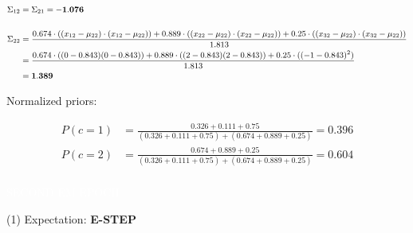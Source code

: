 \documentclass[12pt]{article}
\begin{document}
\begin{enumerate}
    \begin{equation*}
        \fontsize{9pt}{10pt}\selectfont
        \begin{aligned}
            \Sigma_{12} &= \Sigma_{21} = \mathbf{-1.076}\\
            \\
            \Sigma_{22} &= \frac{0.674 \cdot ((x_{12}-\mu_{22}) \cdot (x_{12} - \mu_{22}))+ 0.889 \cdot ((x_{22}-\mu_{22}) \cdot (x_{22} - \mu_{22}))+ 0.25 \cdot ((x_{32}-\mu_{22}) \cdot (x_{32} - \mu_{22}))}{1.813}\\
            &=\frac{0.674 \cdot ((0-0.843)(0-0.843)) + 0.889 \cdot ((2-0.843)(2-0.843)) + 0.25 \cdot ((-1-0.843)^2)}{1.813}\\
            &= \mathbf{1.389}\\
        \end{aligned}
    \end{equation*}

    Normalized priors:

    \begin{equation*}
        \begin{aligned}
            P(c=1) &= \frac{0.326+0.111+0.75}{(0.326+0.111+0.75) + (0.674+0.889+0.25)} = 0.396\\
            P(c=2) &= \frac{0.674+0.889+0.25}{(0.326+0.111+0.75) + (0.674+0.889+0.25)} = 0.604\\
        \end{aligned}
    \end{equation*}

    \vspace{20pt}
    \colorbox{codeblue}{\textcolor{white}{SECOND EM EPOCH}}

    \vspace{10pt}
    (1) Expectation: \textbf{\textcolor{codeblue}{E-STEP}}
        
        \vspace{10pt}


\end{enumerate}
\end{document}
